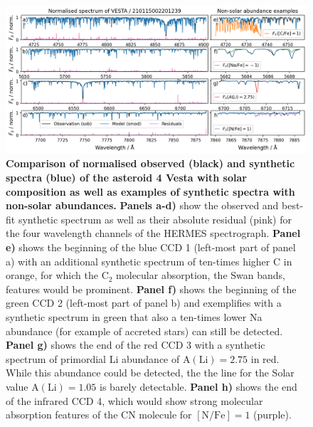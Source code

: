 \documentclass[
  journal=pasa,
  manuscript=research-paper, %
  year=2023,
  volume=37
]{cup-journal}
\begin{document}
\begin{figure}[ht]
 \centering
 \includegraphics[width=\textwidth]{figures/210115002201239_abundance_examples.png}
 \caption{\textbf{Comparison of normalised observed (black) and synthetic spectra (blue) of the asteroid 4 Vesta with solar composition as well as examples of synthetic spectra with non-solar abundances.}
 \textbf{Panels a-d)} show the observed and best-fit synthetic spectrum as well as their absolute residual (pink) for the four wavelength channels of the HERMES spectrograph.
 \textbf{Panel e)} shows the beginning of the blue CCD 1 (left-most part of panel a) with an additional synthetic spectrum of ten-times higher C in orange, for which the $\mathrm{C}_2$ molecular absorption, the Swan bands, features would be prominent.
 \textbf{Panel f)} shows the beginning of the green CCD 2 (left-most part of panel b) and exemplifies with a synthetic spectrum in green that also a ten-times lower Na abundance (for example of accreted stars) can still be detected. 
 \textbf{Panel g)} shows the end of the red CCD 3 with a synthetic spectrum of primordial Li abundance of $\mathrm{A(Li)} = 2.75$ in red. While this abundance could be detected, the the line for the Solar value $\mathrm{A(Li)} = 1.05$ is barely detectable.
 \textbf{Panel h)} shows the end of the infrared CCD 4, which would show strong molecular absorption features of the CN molecule for $\mathrm{[N/Fe]} = 1$ (purple).
 }
 \label{fig:210115002201239_abundance_examples}
\end{figure}
\end{document}
